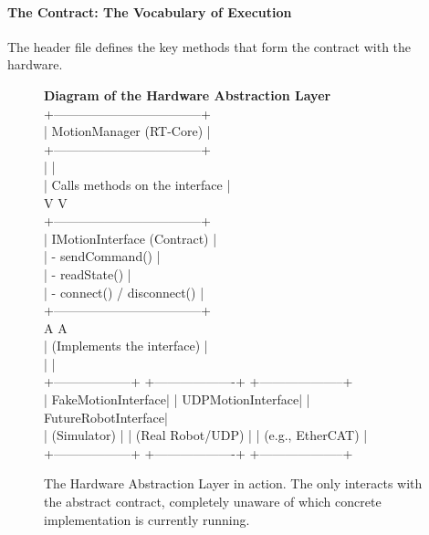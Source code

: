 \paragraph{The  Contract: The Vocabulary of Execution}
The header file  defines the key methods that form the contract with the hardware.

\begin{figure}[h!]
    \centering
    \begin{tcolorbox}[width=\textwidth, sharp corners, title=The HAL Abstraction]
        \textbf{Diagram of the Hardware Abstraction Layer}
        \vspace{0.5cm}
       \\ +-----------------------------------+ \\
        |      MotionManager (RT-Core)      | \\
        +-----------------------------------+ \\
        |                                   | \\
        | Calls methods on the interface    | \\
        V                                   V \\
        +-----------------------------------+ \\
        |      IMotionInterface (Contract)  | \\
        | - sendCommand()                   | \\
        | - readState()                     | \\
        | - connect() / disconnect()        | \\
        +-----------------------------------+ \\
        A                                   A \\
        | (Implements the interface)        | \\
        |                                   | \\
        +------------------+   +-------------------+   +--------------------+ \\
        | FakeMotionInterface|   | UDPMotionInterface|   | FutureRobotInterface| \\
        | (Simulator)      |   | (Real Robot/UDP)  |   | (e.g., EtherCAT)   | \\
        +------------------+   +-------------------+   +--------------------+
    \end{tcolorbox}
    \caption{The Hardware Abstraction Layer in action. The  only interacts with the abstract  contract, completely unaware of which concrete implementation is currently running.}
    \label{fig:hal_abstraction}
\end{figure}

